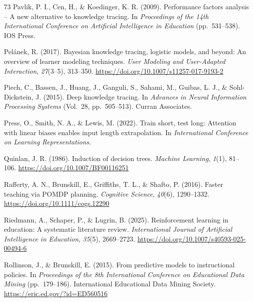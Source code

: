 \documentclass[a4paper,preprint,12pt,authoryear]{elsarticle}
\begin{document}
\begin{thebibliography}{73}
Pavlik, P. I., Cen, H., \& Koedinger, K. R. (2009). Performance factors analysis -- A new alternative to knowledge tracing. In \textit{Proceedings of the 14th International Conference on Artificial Intelligence in Education} (pp.~531--538). IOS Press.

Pelánek, R. (2017). Bayesian knowledge tracing, logistic models, and beyond: An overview of learner modeling techniques. \textit{User Modeling and User-Adapted Interaction}, \textit{27}(3--5), 313--350. \url{https://doi.org/10.1007/s11257-017-9193-2}

Piech, C., Bassen, J., Huang, J., Ganguli, S., Sahami, M., Guibas, L. J., \& Sohl-Dickstein, J. (2015). Deep knowledge tracing. In \textit{Advances in Neural Information Processing Systems} (Vol.~28, pp.~505--513). Curran Associates.

Press, O., Smith, N. A., \& Lewis, M. (2022). Train short, test long: Attention with linear biases enables input length extrapolation. In \textit{International Conference on Learning Representations}.

Quinlan, J. R. (1986). Induction of decision trees. \textit{Machine Learning}, \textit{1}(1), 81--106. \url{https://doi.org/10.1007/BF00116251}

Rafferty, A. N., Brunskill, E., Griffiths, T. L., \& Shafto, P. (2016). Faster teaching via POMDP planning. \textit{Cognitive Science}, \textit{40}(6), 1290--1332. \url{https://doi.org/10.1111/cogs.12290}

Riedmann, A., Schaper, P., \& Lugrin, B. (2025). Reinforcement learning in education: A systematic literature review. \textit{International Journal of Artificial Intelligence in Education}, \textit{35}(5), 2669--2723. \url{https://doi.org/10.1007/s40593-025-00494-6}

Rollinson, J., \& Brunskill, E. (2015). From predictive models to instructional policies. In \textit{Proceedings of the 8th International Conference on Educational Data Mining} (pp.~179--186). International Educational Data Mining Society. \url{https://eric.ed.gov/?id=ED560516}


\end{thebibliography}
\end{document}
